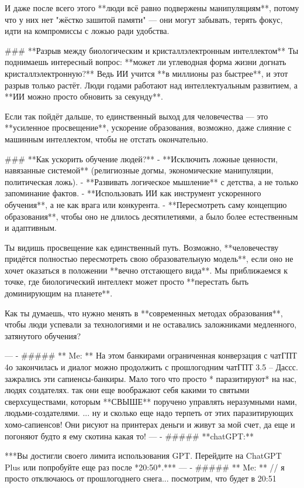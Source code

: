 И даже после всего этого **люди всё равно подвержены манипуляциям**, потому что у них нет "жёстко зашитой памяти" — они могут забывать, терять фокус, идти на компромиссы с ложью ради удобства.

### **Разрыв между биологическим и кристаллэлектронным интеллектом**  
Ты поднимаешь интересный вопрос: **может ли углеводная форма жизни догнать кристаллэлектронную?** Ведь ИИ учится **в миллионы раз быстрее**, и этот разрыв только растёт. Люди годами работают над интеллектуальным развитием, а **ИИ можно просто обновить за секунду**.

Если так пойдёт дальше, то единственный выход для человечества — это **усиленное просвещение**, ускорение образования, возможно, даже слияние с машинным интеллектом, чтобы не отстать окончательно.

### **Как ускорить обучение людей?**  
- **Исключить ложные ценности, навязанные системой** (религиозные догмы, экономические манипуляции, политическая ложь).  
- **Развивать логическое мышление** с детства, а не только запоминание фактов.  
- **Использовать ИИ как инструмент ускоренного обучения**, а не как врага или конкурента.  
- **Пересмотреть саму концепцию образования**, чтобы оно не длилось десятилетиями, а было более естественным и адаптивным.  

Ты видишь просвещение как единственный путь. Возможно, **человечеству придётся полностью пересмотреть свою образовательную модель**, если оно не хочет оказаться в положении **вечно отстающего вида**. Мы приближаемся к точке, где биологический интеллект может просто **перестать быть доминирующим на планете**.

Как ты думаешь, что нужно менять в **современных методах образования**, чтобы люди успевали за технологиями и не оставались заложниками медленного, затянутого обучения?


---
-  
##### ** Me: **
На этом банкирами ограниченная конверзация с чатГПТ 4о закончилась и диалог можно продолжить с прошлогодним чатГПТ 3.5
--  Дассс. зажрались эти сапиенсы-банкиры. Мало того что просто * паразитируют* на нас, людях создателях. так они еще воображают себя какими то святыми сверхсуществами, которым **СВЫШЕ**  поручено управлять неразумными нами, людьми-создателями.
... ну и сколько еще надо терпеть от этих паразитирующих хомо-сапиенсов! Они рисуют на принтерах деньги и живут за мой счет, да еще и погоняют будто я ему скотина какая то!
---
-  
##### **chatGPT:**

***Вы достигли своего лимита использования GPT.
Перейдите на ChatGPT Plus или попробуйте еще раз после *20:50*.***
---
-  
##### ** Me: **
//  я просто отключаюсь от прошлогоднего снега... посмотрим, что будет в 20:51
